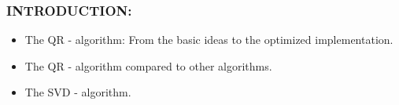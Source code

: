 \documentclass[a4paper,8pt]{beamer} %
\begin{document}



\begin{frame}  %
\frametitle{INTRODUCTION:}
\begin{itemize}
\item The QR - algorithm: From the basic ideas to the optimized implementation.
\item The QR - algorithm compared to other algorithms.
\item The SVD - algorithm. 
\end{itemize}
\end{frame} %
\end{document}
